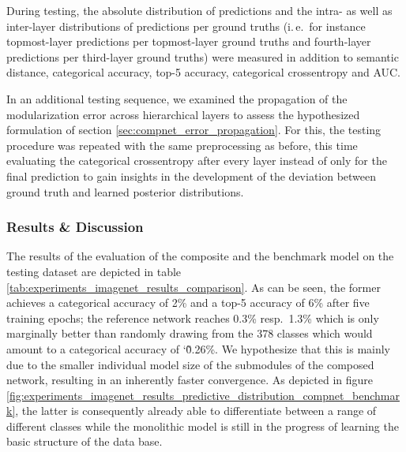 During testing, the absolute distribution of predictions and the intra- as well as inter-layer distributions of predictions per ground truths (i.\,e.\ for instance topmost-layer predictions per topmost-layer ground truths and fourth-layer predictions per third-layer ground truths) were measured in addition to semantic distance, categorical accuracy, top-5 accuracy, categorical crossentropy and AUC.

In an additional testing sequence, we examined the propagation of the modularization error across hierarchical layers to assess the hypothesized formulation of section \ref{sec:compnet_error_propagation}. For this, the testing procedure was repeated with the same preprocessing as before, this time evaluating the categorical crossentropy after every layer instead of only for the final prediction to gain insights in the development of the deviation between ground truth and learned posterior distributions. 
               
\subsubsection{Results \& Discussion%
               \label{sec:experiments_imagenet_results}}

The results of the evaluation of the composite and the benchmark model on the testing dataset are depicted in table \ref{tab:experiments_imagenet_results_comparison}. As can be seen, the former achieves a categorical accuracy of 2\% and a top-5 accuracy of 6\% after five training epochs; the reference network reaches 0.3\% resp.\ 1.3\% which is only marginally better than randomly drawing from the 378 classes which would amount to a categorical accuracy of \char`\~0.26\%. We hypothesize that this is mainly due to the smaller individual model size of the submodules of the composed network, resulting in an inherently faster convergence. As depicted in figure \ref{fig:experiments_imagenet_results_predictive_distribution_compnet_benchmark}, the latter is consequently already able to differentiate between a range of different classes while the monolithic model is still in the progress of learning the basic structure of the data base.

